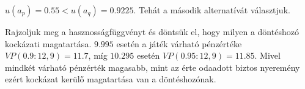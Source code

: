 \documentclass[a4paper,12pt]{article}
\begin{document}
$u(a_p) = 0.55  < u(a_q) = 0.9225$. Tehát a második alternatívát választjuk.

Rajzoljuk meg a hasznosságfüggvényt és döntsük el, hogy milyen a döntéshozó kockázati magatartása. $9.995$ esetén a játék várható pénzértéke $VP(0.9: 12,9)=11.7$, míg $10.295$ esetén $VP(0.95: 12,9)=11.85$. Mivel mindkét várható pénzérték magasabb, mint az érte odaadott biztos nyeremény ezért kockázat kerülő magatartása van a döntéshozónak.







\end{document}
